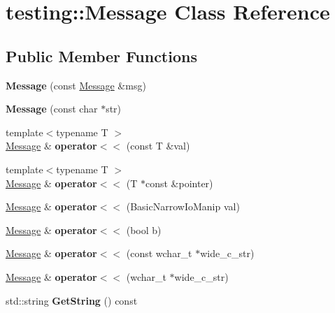 \hypertarget{classtesting_1_1_message}{}\section{testing\+:\+:Message Class Reference}
\label{classtesting_1_1_message}
\subsection*{Public Member Functions}
\begin{DoxyCompactItemize}
\item 
\mbox{\label{classtesting_1_1_message_ac126e24804817a053bebba0920d94a11}} 
{\bfseries Message} (const \hyperlink{classtesting_1_1_message}{Message} \&msg)
\item 
\mbox{\label{classtesting_1_1_message_a9de694ca239486809fc99fbbea8ac21d}} 
{\bfseries Message} (const char $\ast$str)
\item 
\mbox{\label{classtesting_1_1_message_a2e0e71be52d54c20a75a55fca812721f}} 
{\footnotesize template$<$typename T $>$ }\\\hyperlink{classtesting_1_1_message}{Message} \& {\bfseries operator$<$$<$} (const T \&val)
\item 
\mbox{\label{classtesting_1_1_message_aa3ab685879958f90d2d8cd5b68d10c34}} 
{\footnotesize template$<$typename T $>$ }\\\hyperlink{classtesting_1_1_message}{Message} \& {\bfseries operator$<$$<$} (T $\ast$const \&pointer)
\item 
\mbox{\label{classtesting_1_1_message_a3a71a1c1c8ea52de5852d75483d41453}} 
\hyperlink{classtesting_1_1_message}{Message} \& {\bfseries operator$<$$<$} (Basic\+Narrow\+Io\+Manip val)
\item 
\mbox{\label{classtesting_1_1_message_a3e1e04f23b1bdfe18adfd59928296346}} 
\hyperlink{classtesting_1_1_message}{Message} \& {\bfseries operator$<$$<$} (bool b)
\item 
\mbox{\label{classtesting_1_1_message_a34774e225944cb6df02db9689d312aae}} 
\hyperlink{classtesting_1_1_message}{Message} \& {\bfseries operator$<$$<$} (const wchar\+\_\+t $\ast$wide\+\_\+c\+\_\+str)
\item 
\mbox{\label{classtesting_1_1_message_aae57eefb3a72a19c11453d630b1d846c}} 
\hyperlink{classtesting_1_1_message}{Message} \& {\bfseries operator$<$$<$} (wchar\+\_\+t $\ast$wide\+\_\+c\+\_\+str)
\item 
\mbox{\label{classtesting_1_1_message_a2cdc4df62bdcc9df37651a1cf527704e}} 
std\+::string {\bfseries Get\+String} () const
\end{DoxyCompactItemize}
